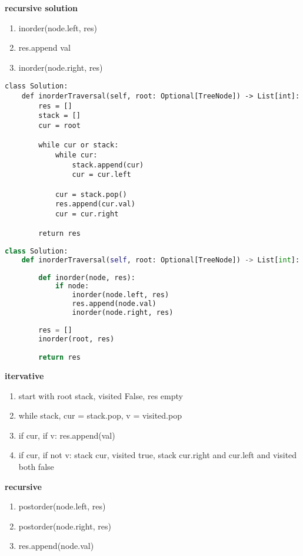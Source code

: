 \documentclass{assignmeownt}
\begin{document}
\textbf{recursive solution}
\begin{enumerate}
    \item inorder(node.left, res)
    \item res.append val
    \item inorder(node.right, res)
\end{enumerate}

\begin{lstlisting}[caption = inorder traversal iterative]
    class Solution:
    def inorderTraversal(self, root: Optional[TreeNode]) -> List[int]:
        res = []
        stack = []
        cur = root

        while cur or stack:
            while cur:
                stack.append(cur)
                cur = cur.left
            
            cur = stack.pop()
            res.append(cur.val)
            cur = cur.right
        
        return res

\end{lstlisting}


\begin{lstlisting}[language=Python, caption=in-order traversal dp]
class Solution:
    def inorderTraversal(self, root: Optional[TreeNode]) -> List[int]:
        
        def inorder(node, res):
            if node:
                inorder(node.left, res)
                res.append(node.val)
                inorder(node.right, res)
            
        res = []
        inorder(root, res)

        return res

\end{lstlisting}


\textbf{itervative}
\begin{enumerate}
    \item start with root stack, visited False, res empty
    \item while stack, cur = stack.pop, v = visited.pop
    \item if cur, if v: res.append(val)
    \item if cur, if not v: stack cur, visited true, stack cur.right and cur.left and visited both false
\end{enumerate}

\textbf{recursive}
\begin{enumerate}
    \item postorder(node.left, res)
    \item postorder(node.right, res)
    \item res.append(node.val)
\end{enumerate}
\end{document}
